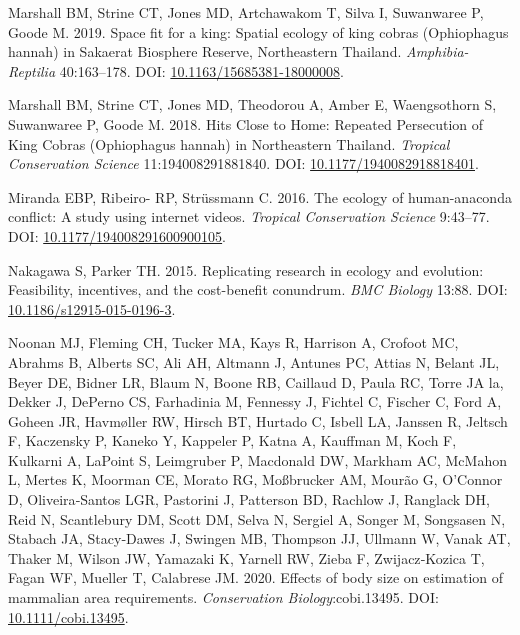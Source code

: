 \documentclass[10pt,a4paper]{article}
\newlength{\cslhangindent}
\newenvironment{CSLReferences}[2] %
 {\begin{list}{}{%
  \setlength{\itemindent}{0pt}
  \setlength{\leftmargin}{0pt}
  \setlength{\parsep}{0pt}
  \ifodd #1
   \setlength{\leftmargin}{\cslhangindent}
   \setlength{\itemindent}{-1\cslhangindent}
  \fi
  \setlength{\itemsep}{#2\baselineskip}}}
 {\end{list}}
\begin{document}
\begin{CSLReferences}{1}{0}
Marshall BM, Strine CT, Jones MD, Artchawakom T, Silva I, Suwanwaree P, Goode M. 2019. Space fit for a king: Spatial ecology of king cobras ({Ophiophagus} hannah) in {Sakaerat} {Biosphere} {Reserve}, {Northeastern} {Thailand}. \emph{Amphibia-Reptilia} 40:163--178. DOI: \href{https://doi.org/10.1163/15685381-18000008}{10.1163/15685381-18000008}.

Marshall BM, Strine CT, Jones MD, Theodorou A, Amber E, Waengsothorn S, Suwanwaree P, Goode M. 2018. Hits {Close} to {Home}: {Repeated} {Persecution} of {King} {Cobras} ({Ophiophagus} hannah) in {Northeastern} {Thailand}. \emph{Tropical Conservation Science} 11:194008291881840. DOI: \href{https://doi.org/10.1177/1940082918818401}{10.1177/1940082918818401}.

Miranda EBP, Ribeiro- RP, Strüssmann C. 2016. The ecology of human-anaconda conflict: A study using internet videos. \emph{Tropical Conservation Science} 9:43--77. DOI: \href{https://doi.org/10.1177/194008291600900105}{10.1177/194008291600900105}.

Nakagawa S, Parker TH. 2015. Replicating research in ecology and evolution: Feasibility, incentives, and the cost-benefit conundrum. \emph{BMC Biology} 13:88. DOI: \href{https://doi.org/10.1186/s12915-015-0196-3}{10.1186/s12915-015-0196-3}.

Noonan MJ, Fleming CH, Tucker MA, Kays R, Harrison A, Crofoot MC, Abrahms B, Alberts SC, Ali AH, Altmann J, Antunes PC, Attias N, Belant JL, Beyer DE, Bidner LR, Blaum N, Boone RB, Caillaud D, Paula RC, Torre JA la, Dekker J, DePerno CS, Farhadinia M, Fennessy J, Fichtel C, Fischer C, Ford A, Goheen JR, Havmøller RW, Hirsch BT, Hurtado C, Isbell LA, Janssen R, Jeltsch F, Kaczensky P, Kaneko Y, Kappeler P, Katna A, Kauffman M, Koch F, Kulkarni A, LaPoint S, Leimgruber P, Macdonald DW, Markham AC, McMahon L, Mertes K, Moorman CE, Morato RG, Moßbrucker AM, Mourão G, O'Connor D, Oliveira‐Santos LGR, Pastorini J, Patterson BD, Rachlow J, Ranglack DH, Reid N, Scantlebury DM, Scott DM, Selva N, Sergiel A, Songer M, Songsasen N, Stabach JA, Stacy‐Dawes J, Swingen MB, Thompson JJ, Ullmann W, Vanak AT, Thaker M, Wilson JW, Yamazaki K, Yarnell RW, Zieba F, Zwijacz‐Kozica T, Fagan WF, Mueller T, Calabrese JM. 2020. Effects of body size on estimation of mammalian area requirements. \emph{Conservation Biology}:cobi.13495. DOI: \href{https://doi.org/10.1111/cobi.13495}{10.1111/cobi.13495}.


\end{CSLReferences}
\end{document}

